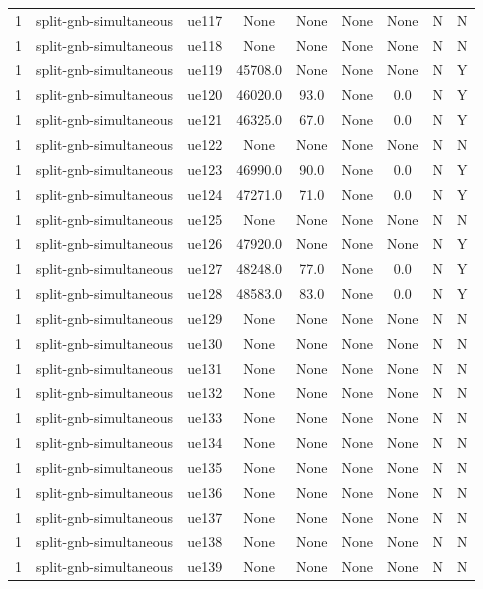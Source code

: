 \begin{table}[ht]
\begin{tabular}{|c|c|c|c|c|c|c|c|c|}
1 & split-gnb-simultaneous & ue117 & None & None & None & None & N & N \\
1 & split-gnb-simultaneous & ue118 & None & None & None & None & N & N \\
1 & split-gnb-simultaneous & ue119 & 45708.0 & None & None & None & N & Y \\
1 & split-gnb-simultaneous & ue120 & 46020.0 & 93.0 & None & 0.0 & N & Y \\
1 & split-gnb-simultaneous & ue121 & 46325.0 & 67.0 & None & 0.0 & N & Y \\
1 & split-gnb-simultaneous & ue122 & None & None & None & None & N & N \\
1 & split-gnb-simultaneous & ue123 & 46990.0 & 90.0 & None & 0.0 & N & Y \\
1 & split-gnb-simultaneous & ue124 & 47271.0 & 71.0 & None & 0.0 & N & Y \\
1 & split-gnb-simultaneous & ue125 & None & None & None & None & N & N \\
1 & split-gnb-simultaneous & ue126 & 47920.0 & None & None & None & N & Y \\
1 & split-gnb-simultaneous & ue127 & 48248.0 & 77.0 & None & 0.0 & N & Y \\
1 & split-gnb-simultaneous & ue128 & 48583.0 & 83.0 & None & 0.0 & N & Y \\
1 & split-gnb-simultaneous & ue129 & None & None & None & None & N & N \\
1 & split-gnb-simultaneous & ue130 & None & None & None & None & N & N \\
1 & split-gnb-simultaneous & ue131 & None & None & None & None & N & N \\
1 & split-gnb-simultaneous & ue132 & None & None & None & None & N & N \\
1 & split-gnb-simultaneous & ue133 & None & None & None & None & N & N \\
1 & split-gnb-simultaneous & ue134 & None & None & None & None & N & N \\
1 & split-gnb-simultaneous & ue135 & None & None & None & None & N & N \\
1 & split-gnb-simultaneous & ue136 & None & None & None & None & N & N \\
1 & split-gnb-simultaneous & ue137 & None & None & None & None & N & N \\
1 & split-gnb-simultaneous & ue138 & None & None & None & None & N & N \\
1 & split-gnb-simultaneous & ue139 & None & None & None & None & N & N \\

\end{tabular}
\end{table}
